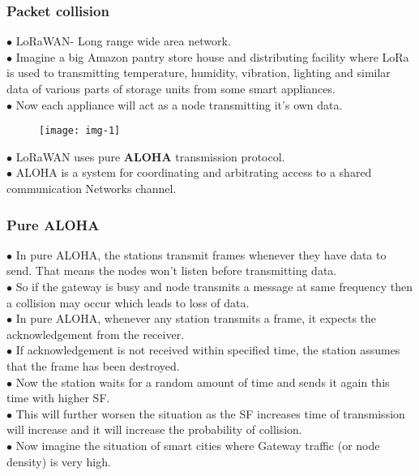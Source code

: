 \documentclass{beamer}
\begin{document}
\begin{frame}
\frametitle{Packet collision}

$\bullet$ LoRaWAN- Long range wide area network.\\
$\bullet$ Imagine a big Amazon pantry store house and distributing facility where LoRa is used to  transmitting temperature, humidity, vibration, lighting and similar data of various parts of storage units from some smart appliances.\\
$\bullet$ Now each appliance will act as a node transmitting it's own data.\\
\begin{figure}[h]
    \centering
    \texttt{[image: img-1]}
\end{figure}
$\bullet$ LoRaWAN uses pure \textbf{ALOHA} transmission protocol.\\ 
$\bullet$ ALOHA is a system for coordinating and arbitrating access to a shared communication Networks channel.\\

\end{frame}


\begin{frame}
\frametitle{Pure ALOHA}
$\bullet$ In pure ALOHA, the stations transmit frames whenever they have data to send. That means the nodes won't listen before transmitting data.\\
$\bullet$ So if the gateway is busy and node transmits a message at same frequency then a collision may occur which leads to loss of data.\\
$\bullet$ In pure ALOHA, whenever any station transmits a frame, it expects the acknowledgement from the receiver.\\
$\bullet$ If acknowledgement is not received within specified time, the station assumes that the frame has been destroyed.\\
$\bullet$ Now the station waits for a random amount of time and sends it again this time with higher SF.\\
$\bullet$ This will further worsen the situation as the SF increases time of transmission will increase and it will increase the probability of collision.\\
$\bullet$ Now imagine the situation of smart cities where Gateway traffic (or node density) is very high. 

\end{frame}
\end{document}
